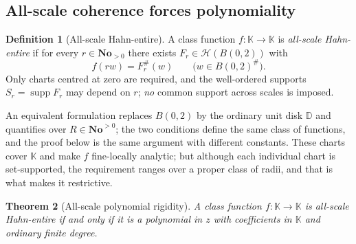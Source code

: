 \documentclass[11pt,a4paper]{article}
\numberwithin{equation}{section}
\newtheorem{theorem}{Theorem}[section]
\theoremstyle{definition}
\newtheorem{definition}[theorem]{Definition}
\theoremstyle{remark}
\theoremstyle{plain}
\newcommand{\K}{\mathbb K}
\newcommand{\No}{\mathbf{No}}
\DeclareMathOperator{\supp}{supp}
\newcommand{\halo}[1]{#1^{\#}}
\newcommand{\ev}[1]{#1^{\#}}
\newcommand{\Hc}{\mathcal H}
\begin{document}
\subsection{All-scale coherence forces polynomiality}
\label{f:sub-rigidity}

\begin{definition}[All-scale Hahn-entire]\label{f:def-allscale}
A class function $f:\K\to\K$ is \emph{all-scale Hahn-entire} if for
every $r\in\No_{>0}$ there exists $F_{r}\in\Hc(B(0,2))$ with
\begin{equation}\label{f:eq-allscale}
 f(rw)=\ev{F_{r}}(w)\qquad\bigl(w\in\halo{B(0,2)}\bigr).
\end{equation}
Only charts centred at zero are required, and the well-ordered supports
$S_{r}=\supp F_{r}$ may depend on $r$; \emph{no} common support across
scales is imposed.
\end{definition}

An equivalent formulation replaces $B(0,2)$ by the ordinary unit disk
$\mathbb D$ and quantifies over $R\in\No^{>0}$; the two conditions
define the same class of functions, and the proof below is the same
argument with different constants.  These charts cover $\K$ and make $f$
fine-locally analytic; but although each individual chart is
set-supported, the requirement ranges over a proper class of radii, and
that is what makes it restrictive.

\begin{theorem}[All-scale polynomial rigidity]\label{f:thm-rigidity}
A class function $f:\K\to\K$ is all-scale Hahn-entire if and only if it
is a polynomial in $z$ with coefficients in $\K$ and ordinary finite
degree.
\end{theorem}
\end{document}
